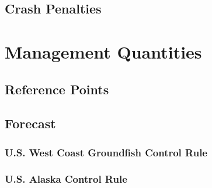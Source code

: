\documentclass[11pt,
  english,
  letterpaper,
]{article}
\begin{document}
\leavevmode\tagmcend\tagstructend


\hypertarget{crash-penalties}{%
\subsection{Crash Penalties}\label{crash-penalties}}

\leavevmode\tagmcend\tagstructend


\hypertarget{management-quantities}{%
\section{Management Quantities}\label{management-quantities}}

\leavevmode\tagmcend\tagstructend


\hypertarget{reference-points}{%
\subsection{Reference Points}\label{reference-points}}

\leavevmode\tagmcend\tagstructend


\hypertarget{forecast}{%
\subsection{Forecast}\label{forecast}}

\leavevmode\tagmcend\tagstructend


\hypertarget{u.s.-west-coast-groundfish-control-rule}{%
\subsubsection{U.S. West Coast Groundfish Control Rule}\label{u.s.-west-coast-groundfish-control-rule}}

\leavevmode\tagmcend\tagstructend


\hypertarget{u.s.-alaska-control-rule}{%
\subsubsection{U.S. Alaska Control Rule}\label{u.s.-alaska-control-rule}}
\end{document}
